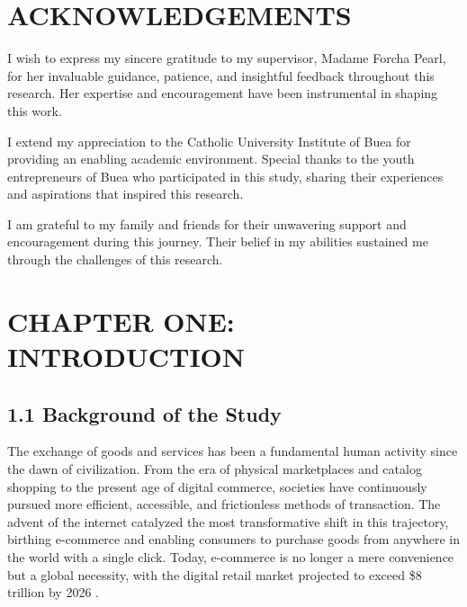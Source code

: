 \documentclass[12pt,a4paper]{article}
\begin{document}
\section*{ACKNOWLEDGEMENTS}

\noindent I wish to express my sincere gratitude to my supervisor, Madame Forcha Pearl, for her invaluable guidance, patience, and insightful feedback throughout this research. Her expertise and encouragement have been instrumental in shaping this work.

I extend my appreciation to the Catholic University Institute of Buea for providing an enabling academic environment. Special thanks to the youth entrepreneurs of Buea who participated in this study, sharing their experiences and aspirations that inspired this research.

I am grateful to my family and friends for their unwavering support and encouragement during this journey. Their belief in my abilities sustained me through the challenges of this research.

\newpage

\tableofcontents
\newpage

\listoftables
\newpage

\listoffigures
\newpage

\section{CHAPTER ONE: INTRODUCTION}

\subsection{1.1 Background of the Study}

The exchange of goods and services has been a fundamental human activity since the dawn of civilization. From the era of physical marketplaces and catalog shopping to the present age of digital commerce, societies have continuously pursued more efficient, accessible, and frictionless methods of transaction. The advent of the internet catalyzed the most transformative shift in this trajectory, birthing e-commerce and enabling consumers to purchase goods from anywhere in the world with a single click. Today, e-commerce is no longer a mere convenience but a global necessity, with the digital retail market projected to exceed \$8 trillion by 2026 \citep{statista2024}.
\end{document}
